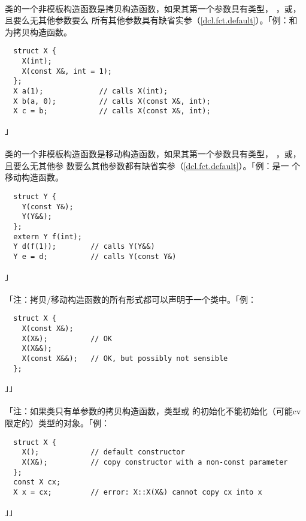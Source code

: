 \paragraph{}
类的一个非模板构造函数是拷贝构造函数，如果其第一个参数具有类型，
，或，且要么无其他参数要么
所有其他参数具有缺省实参（\ref{dcl.fct.default}）。「例：和
为拷贝构造函数。
\begin{lstlisting}
  struct X {
    X(int);
    X(const X&, int = 1);
  };
  X a(1);             // calls X(int);
  X b(a, 0);          // calls X(const X&, int);
  X c = b;            // calls X(const X&, int);
\end{lstlisting}」

\paragraph{}
类的一个非模板构造函数是移动构造函数，如果其第一个参数具有类型，
，或，且要么无其他参
数要么其他参数都有缺省实参（\ref{dcl.fct.default}）。「例：是一
个移动构造函数。
\begin{lstlisting}
  struct Y {
    Y(const Y&);
    Y(Y&&);
  };
  extern Y f(int);
  Y d(f(1));        // calls Y(Y&&)
  Y e = d;          // calls Y(const Y&)
\end{lstlisting}」

\paragraph{}
「注：拷贝/移动构造函数的所有形式都可以声明于一个类中。「例：
\begin{lstlisting}
  struct X {
    X(const X&);
    X(X&);          // OK
    X(X&&);
    X(const X&&);   // OK, but possibly not sensible
  };
\end{lstlisting}」」

\paragraph{}
「注：如果类只有单参数的拷贝构造函数，类型或
的初始化不能初始化（可能cv限定的）类型的对象。「例：
\begin{lstlisting}
  struct X {
    X();            // default constructor
    X(X&);          // copy constructor with a non-const parameter
  };
  const X cx;
  X x = cx;         // error: X::X(X&) cannot copy cx into x
\end{lstlisting}」」

